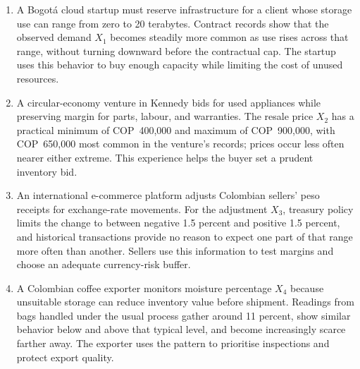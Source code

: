 	\begin{enumerate}
		\item A Bogotá cloud startup must reserve infrastructure for a client whose storage use can range from zero to 20 terabytes. Contract records show that the observed demand \(X_1\) becomes steadily more common as use rises across that range, without turning downward before the contractual cap. The startup uses this behavior to buy enough capacity while limiting the cost of unused resources.
		\item A circular-economy venture in Kennedy bids for used appliances while preserving margin for parts, labour, and warranties. The resale price \(X_2\) has a practical minimum of COP~400,000 and maximum of COP~900,000, with COP~650,000 most common in the venture's records; prices occur less often nearer either extreme. This experience helps the buyer set a prudent inventory bid.
		\item An international e-commerce platform adjusts Colombian sellers' peso receipts for exchange-rate movements. For the adjustment \(X_3\), treasury policy limits the change to between negative 1.5 percent and positive 1.5 percent, and historical transactions provide no reason to expect one part of that range more often than another. Sellers use this information to test margins and choose an adequate currency-risk buffer.
		\item A Colombian coffee exporter monitors moisture percentage \(X_4\) because unsuitable storage can reduce inventory value before shipment. Readings from bags handled under the usual process gather around 11 percent, show similar behavior below and above that typical level, and become increasingly scarce farther away. The exporter uses the pattern to prioritise inspections and protect export quality.
	\end{enumerate}


